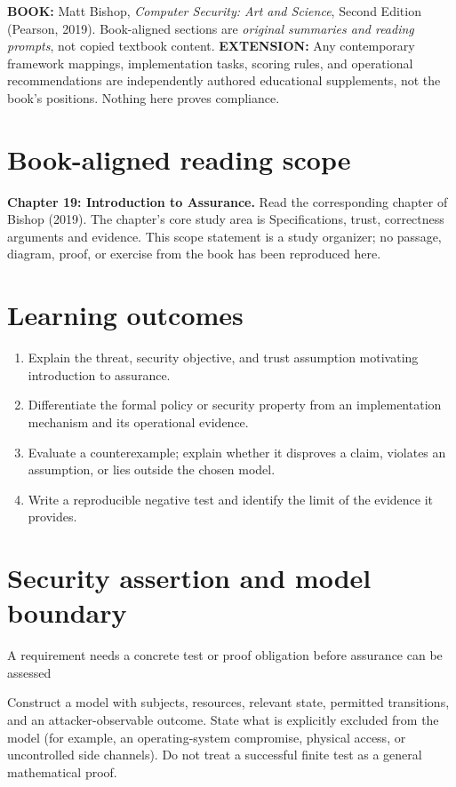 \documentclass[10pt,letterpaper]{article}
\begin{document}
\makedoctocpage
\begin{notebox}
\textbf{BOOK:} Matt Bishop, \emph{Computer Security: Art and Science}, Second Edition (Pearson, 2019). Book-aligned sections are \emph{original summaries and reading prompts}, not copied textbook content.
\textbf{EXTENSION:} Any contemporary framework mappings, implementation tasks, scoring rules, and operational recommendations are independently authored educational supplements, not the book's positions. Nothing here proves compliance.
\end{notebox}
\section{Book-aligned reading scope}
\textbf{Chapter 19: Introduction to Assurance.} Read the corresponding chapter of Bishop (2019). The chapter's core study area is Specifications, trust, correctness arguments and evidence. This scope statement is a study organizer; no passage, diagram, proof, or exercise from the book has been reproduced here.
\section{Learning outcomes}
\begin{enumerate}
\item Explain the threat, security objective, and trust assumption motivating introduction to assurance.
\item Differentiate the formal policy or security property from an implementation mechanism and its operational evidence.
\item Evaluate a counterexample; explain whether it disproves a claim, violates an assumption, or lies outside the chosen model.
\item Write a reproducible negative test and identify the limit of the evidence it provides.
\end{enumerate}
\section{Security assertion and model boundary}
\begin{infobox}
A requirement needs a concrete test or proof obligation before assurance can be assessed
\end{infobox}
Construct a model with subjects, resources, relevant state, permitted transitions, and an attacker-observable outcome. State what is explicitly excluded from the model (for example, an operating-system compromise, physical access, or uncontrolled side channels). Do not treat a successful finite test as a general mathematical proof.
\end{document}

